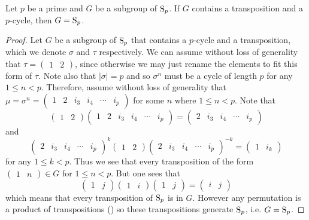 \begin{lemma}\label{lemma-subgroup-containing-transposition-and-maximal-length-cycle-is-whole-symmetric-group}
    Let $p$ be a prime and $G$ be a subgroup of $\mathrm{S}_{p}$. If $G$ contains a transposition and a $p$-cycle, then $G = \mathrm{S}_{p}$.
\end{lemma}
\begin{proof}
    Let $G$ be a subgroup of $\mathrm{S}_{p}$ that contains a $p$-cycle and a transposition, which we denote $\sigma$ and $\tau$ respectively. We can assume without loss of generality that $\tau = \begin{pmatrix}1&2\end{pmatrix}$, since otherwise we may just rename the elements to fit this form of $\tau$. Note also that $|\sigma| = p$ and so $\sigma^n$ must be a cycle of length $p$ for any $1 \leq n < p$. Therefore, assume without loss of generality that $\mu = \sigma^n = \begin{pmatrix}1&2&i_3&i_4&\cdots&i_p\end{pmatrix}$ for some $n$ where $1 \leq n < p$. Note that
    \[
        \begin{pmatrix}1&2\end{pmatrix}\begin{pmatrix}1&2&i_3&i_4&\cdots&i_p\end{pmatrix} = \begin{pmatrix}2&i_3&i_4&\cdots&i_p\end{pmatrix}
    \]
    and
    \[
        \begin{pmatrix}2&i_3&i_4&\cdots&i_p\end{pmatrix}^k\begin{pmatrix}1&2\end{pmatrix}\begin{pmatrix}2&i_3&i_4&\cdots&i_p\end{pmatrix}^{-k} = \begin{pmatrix}1&i_k\end{pmatrix}
    \]
    for any $1 \leq k < p$. Thus we see that every transposition of the form $\begin{pmatrix}1&n\end{pmatrix} \in G$ for $1 \leq n < p$. But one sees that
    \[
        \begin{pmatrix}1&j\end{pmatrix}\begin{pmatrix}1&i\end{pmatrix}\begin{pmatrix}1&j\end{pmatrix} = \begin{pmatrix}i&j\end{pmatrix}
    \]
    which means that every transposition of $\mathrm{S}_{p}$ is in $G$. However any permutation is a product of transpositions () so these transpositions generate $\mathrm{S}_{p}$, i.e. $G = \mathrm{S}_{p}$.
\end{proof}

